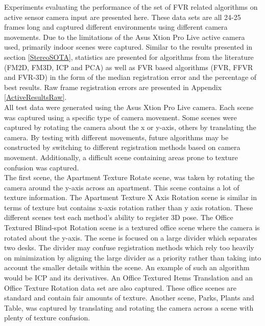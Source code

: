 
Experiments evaluating the performance of the set of FVR related algorithms on active sensor camera input are presented here. These data sets are all 24-25 frames long and captured different environments using different camera movements. Due to the limitations of the Asus Xtion Pro Live active camera used, primarily indoor scenes were captured. Similar to the results presented in section \ref{StereoSOTA}, statistics are presented for algorithms from the literature (FM2D, FM3D, ICP and PCA) as well as FVR based algorithms (FVR, FFVR and FVR-3D) in the form of the median registration error and the percentage of best results. Raw frame registration errors are presented in Appendix \ref{ActiveResultsRaw}. \\

All test data were generated using the Asus Xtion Pro Live camera. Each scene was captured using a specific type of camera movement. Some scenes were captured by rotating the camera about the x or y-axis, others by translating the camera. By testing with different movements, future algorithms may be constructed by switching to different registration methods based on camera movement. Additionally, a difficult scene containing areas prone to texture confusion was captured. \\

The first scene, the Apartment Texture Rotate scene, was taken by rotating the camera around the y-axis across an apartment. This scene contains a lot of texture information. The Apartment Texture X Axis Rotation scene is similar in terms of texture but contains x-axis rotation rather than y axis rotation. These different scenes test each method's ability to register 3D pose. The Office Textured Blind-spot Rotation scene is a textured office scene where the camera is rotated about the y-axis. The scene is focused on a large divider which separates two desks. The divider may confuse registration methods which rely too heavily on minimization by aligning the large divider as a priority rather than taking into account the smaller details within the scene. An example of such an algorithm would be ICP and its derivatives. An Office Textured Items Translation and an Office Texture Rotation data set are also captured. These office scenes are standard and contain fair amounts of texture. Another scene, Parks, Plants and Table, was captured by translating and rotating the camera across a scene with plenty of texture confusion.  \\




